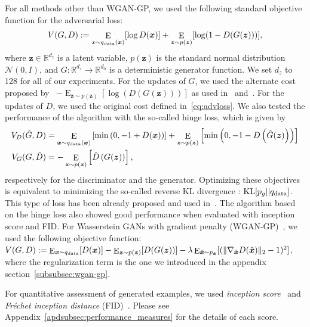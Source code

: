 \documentclass{article}
\newcommand{\bbR}{\mathbb{R}}
\newcommand{\bmx}{{\bm x}}
\newcommand{\bmz}{{\bm z}}
\newcommand{\E}{\mathop{\mathrm{E}}}
\begin{document}
For all methods other than WGAN-GP, we used the following standard objective function for the adversarial loss:
\begin{align}
	V(G, D) := \E_{x\sim q_{\rm data}(\bmx)} [ \log D(\bmx)] +  \E_{\bmz\sim p(\bmz)} [\log(1-D(G(\bmz)))], \label{eq:advloss}
\end{align}
where $\bmz \in \bbR^{d_z}$ is a latent variable, $p(\bmz)$ is the standard normal distribution $\mathcal{N}(0, I)$, and $G: \bbR^{d_z} \to \bbR^{d_0}$ is a deterministic generator function.
We set $d_z$ to 128 for all of our experiments.
For the updates of $G$, we used the alternate cost proposed by~\cite{goodfellow2014generative}
$-\E_{\bmz\sim p(\bmz)} [\log(D(G(\bmz)))]$
as used in~\cite{goodfellow2014generative} and~\cite{warde2016improving}.
For the updates of $D$, we used the original cost defined in~\eqref{eq:advloss}.
We also tested the performance of the algorithm with the so-called hinge loss, which is given by
\begin{align}
	 V_D(\hat{G}, D) &= \E_{\bmx\sim q_{\rm data}(\bmx)}\left[{\rm min}\left(0, -1+D(\bmx)\right)\right] + \E_{\bmz\sim p(\bmz)} \left[{\rm min}\left(0, -1-D\left(\hat{G}(\bmz)\right)\right)\right]\\
     V_G(G, \hat{D}) &= -\E_{\bmz\sim p(\bmz)}\left[\hat{D}\left(G(\bmz)\right)\right], \label{eq:hinge}
\end{align}
respectively for the discriminator and the generator.
Optimizing these objectives is equivalent to minimizing the so-called reverse KL divergence : ${\rm KL}[p_g||q_{\rm data}]$.
This type of loss has been already proposed and used in~\cite{lim2017geometric, tran2017deep}.
The algorithm based on the hinge loss also showed good performance when evaluated with inception score and FID.
For Wasserstein GANs with gradient penalty (WGAN-GP)~\cite[]{gulrajani2017improved}, we used the following objective function:
$V(G, D) := \E_{\bmx \sim q_{\rm data}} [ D(\bmx)] -  \E_{\bmz\sim p(\bmz)} [D(G(\bmz))] - \lambda \E_{\hat{\bmx} \sim p_{\hat{\bmx}}}[(\|\nabla_{\hat{\bmx}}D(\hat{\bmx})\|_2-1)^2] \label{eq:wgan_gp}$,
where the regularization term is the one we introduced in the appendix section~\ref{subsubsec:wgan-gp}.

For quantitative assessment of generated examples, we used \textit{inception score}~\cite[]{salimans2016improved} and \textit{Fr\'echet inception distance} (FID)~\cite[]{heusel2017gans}.
Please see Appendix~\ref{apdsubsec:performance_measures} for the details of each score.
%
\end{document}
